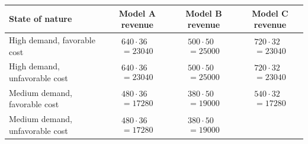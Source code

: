 \begin{ExamProblems}
\begin{center}
			\begin{tabular}{l c c c}
				\toprule
				State of nature & Model A revenue & Model B revenue & Model C revenue \\
				\midrule
				High demand, favorable cost &
				$\begin{array}{l}
					640\cdot 36\\
					= 23040
				\end{array}$ &
				$\begin{array}{l}
					500\cdot 50\\
					= 25000
				\end{array}$ &
				$\begin{array}{l}
					720\cdot 32\\
					= 23040
				\end{array}$ \\
				High demand, unfavorable cost &
				$\begin{array}{l}
					640\cdot 36\\
					= 23040
				\end{array}$ &
				$\begin{array}{l}
					500\cdot 50\\
					= 25000
				\end{array}$ &
				$\begin{array}{l}
					720\cdot 32\\
					= 23040
				\end{array}$ \\
				Medium demand, favorable cost &
				$\begin{array}{l}
					480\cdot 36\\
					= 17280
				\end{array}$ &
				$\begin{array}{l}
					380\cdot 50\\
					= 19000
				\end{array}$ &
				$\begin{array}{l}
					540\cdot 32\\
					= 17280
				\end{array}$ \\
				Medium demand, unfavorable cost &
				$\begin{array}{l}
					480\cdot 36\\
					= 17280
				\end{array}$ &
				$\begin{array}{l}
					380\cdot 50\\
					= 19000
				\end{array}$ &

\end{tabular}
\end{center}
\end{ExamProblems}
